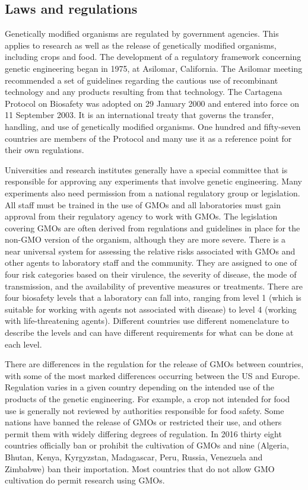\hypertarget{laws-and-regulations}{%
\subsection{Laws and regulations}\label{laws-and-regulations}}

Genetically modified organisms are regulated by government agencies. This applies to research as well as the release of genetically modified organisms, including crops and food. The development of a regulatory framework concerning genetic engineering began in 1975, at Asilomar, California. The Asilomar meeting recommended a set of guidelines regarding the cautious use of recombinant technology and any products resulting from that technology. The Cartagena Protocol on Biosafety was adopted on 29 January 2000 and entered into force on 11 September 2003. It is an international treaty that governs the transfer, handling, and use of genetically modified organisms. One hundred and fifty-seven countries are members of the Protocol and many use it as a reference point for their own regulations.

Universities and research institutes generally have a special committee that is responsible for approving any experiments that involve genetic engineering. Many experiments also need permission from a national regulatory group or legislation. All staff must be trained in the use of GMOs and all laboratories must gain approval from their regulatory agency to work with GMOs. The legislation covering GMOs are often derived from regulations and guidelines in place for the non-GMO version of the organism, although they are more severe. There is a near universal system for assessing the relative risks associated with GMOs and other agents to laboratory staff and the community. They are assigned to one of four risk categories based on their virulence, the severity of disease, the mode of transmission, and the availability of preventive measures or treatments. There are four biosafety levels that a laboratory can fall into, ranging from level 1 (which is suitable for working with agents not associated with disease) to level 4 (working with life-threatening agents). Different countries use different nomenclature to describe the levels and can have different requirements for what can be done at each level.

There are differences in the regulation for the release of GMOs between countries, with some of the most marked differences occurring between the US and Europe. Regulation varies in a given country depending on the intended use of the products of the genetic engineering. For example, a crop not intended for food use is generally not reviewed by authorities responsible for food safety. Some nations have banned the release of GMOs or restricted their use, and others permit them with widely differing degrees of regulation. In 2016 thirty eight countries officially ban or prohibit the cultivation of GMOs and nine (Algeria, Bhutan, Kenya, Kyrgyzstan, Madagascar, Peru, Russia, Venezuela and Zimbabwe) ban their importation. Most countries that do not allow GMO cultivation do permit research using GMOs.

